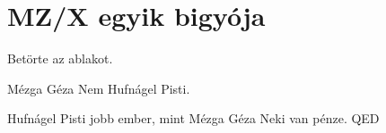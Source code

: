 \section{MZ/X egyik bigyója}
Betörte az ablakot.
\begin{definicio}{Mézga Géza}
Nem Hufnágel Pisti.
\end{definicio}
\begin{bizonyitas}{Hufnágel Pisti jobb ember, mint Mézga Géza}
Neki van pénze. QED
\end{bizonyitas}
